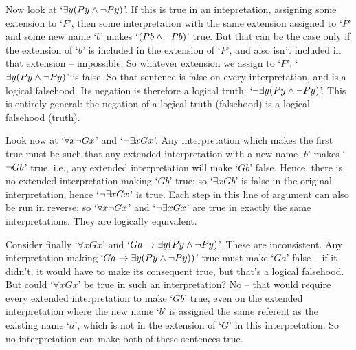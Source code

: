 \begin{earg}
Now look at `$\exists y (Py \wedge \neg Py)$'. If this is true in an intepretation, assigning some extension to `$P$', then some interpretation with the same extension assigned to `$P$' and some new name `$b$' makes `$(Pb \wedge \neg Pb)$' true. But that can be the case only if the extension of `$b$' is included in the extension of `$P$', and also isn't included in that extension – impossible. So whatever extension we assign to `$P$', `$\exists y (Py \wedge \neg Py)$' is false. So that sentence is false on every interpretation, and is a logical falsehood. Its negation is therefore a logical truth: `$\neg \exists y (Py \wedge \neg Py)$'. This is entirely general: the negation of a logical truth (falsehood) is a logical falsehood (truth).

Look now at `$\forall x \neg Gx$' and `$\neg \exists x Gx$'. Any interpretation which makes the first true must be such that any extended interpretation with a new name `$b$' makes `$\neg Gb$' true, i.e., any extended interpretation will make `$Gb$' false. Hence, there is no extended interpretation making `$Gb$' true; so `$\exists x Gb$' is false in the original interpretation, hence `$\neg\exists x Gx$' is true. Each step in this line of argument can also be run in reverse; so `$\forall x \neg Gx$' and `$\neg\exists x Gx$' are true in exactly the same interpretations. They are logically equivalent. 


Consider finally `$\forall x Gx$' and `$Ga \rightarrow \exists y (Py \wedge \neg Py)$'. These are inconsistent. Any interpretation making `$Ga \rightarrow \exists y(Py \wedge \neg Py))$' true must make `$Ga$' false – if it didn't, it would have to make its consequent true, but that's a logical falsehood. But could `$\forall x Gx$' be true in such an interpretation? No – that would require every extended interpretation to make `$Gb$' true, even on the extended interpretation where the new name `$b$' is assigned the same referent as the existing name `$a$', which is not in the extension of `$G$' in this interpretation. So no interpretation can make both of these sentences true.


\end{earg}
